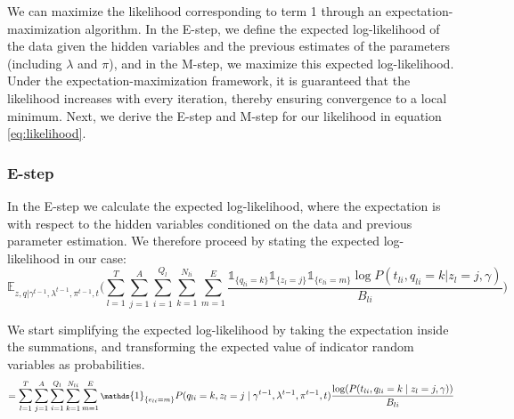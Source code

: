 We can maximize the likelihood corresponding to term 1 through an expectation-maximization algorithm. In the E-step, we define the expected log-likelihood of the data given the hidden variables and the previous estimates of the parameters (including $\lambda$ and $\pi$), and in the M-step, we maximize this expected log-likelihood. Under the expectation-maximization framework, it is guaranteed that the likelihood increases with every iteration, thereby ensuring convergence to a local minimum. Next, we derive the E-step and M-step for our likelihood in equation \ref{eq:likelihood}.
 
\subsubsection{E-step}

In the E-step we calculate the expected log-likelihood, where the expectation is with respect to the hidden variables conditioned on the data and previous parameter estimation. We therefore proceed by stating the expected log-likelihood in our case:
\begin{equation}
   \mathbb{E}_{z, q | \gamma^{t-1}, \lambda^{t-1}, \pi^{t-1}, t} \Big(  \sum_{l = 1}^T \sum_{j = 1}^A \sum_{i = 1}^{Q_l} \sum_{k =1}^{N_{li}} \sum_{m = 1}^E  \frac{\mathds{1}_{\{q_{l i} = k\}} \mathds{1}_{\{z_l = j\}} \mathds{1}_{\{e_{l i} = m\}} \log P(t_{li}, q_{l i} = k \vert z_l = j, \gamma)}{B_{li}} \Big)
 \end{equation}

We start simplifying the expected log-likelihood by taking the expectation inside the summations, and transforming the expected value of indicator random variables as probabilities.  
\begin{equation}
    \footnotesize
    = \sum_{l = 1}^T \sum_{j = 1}^A  \sum_{i = 1}^{Q_l} \sum_{k =1}^{N_{li}} \sum_{m = 1}^E \mathds{1}_{\{e_{l i} = m\}} P(q_{li} = k, z_l = j \mid \gamma^{t-1}, \lambda^{t-1}, \pi^{t-1}, t) \frac{\log(P(t_{li}, q_{l i} = k \mid z_l = j, \gamma ))}{B_{li}}
\end{equation}

